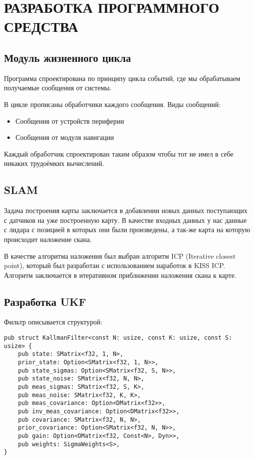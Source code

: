 \section{РАЗРАБОТКА ПРОГРАММНОГО СРЕДСТВА} %

\subsection{Модуль жизненного цикла}
Программа спроектирована по принципу цикла событий, где мы обрабатываем получаемые сообщения от системы.

В цикле прописаны обработчики каждого сообщения.
Виды сообщений:
\begin{itemize}
	\item Сообщения от устройств периферии
	\item Сообщения от модуля навигации
\end{itemize}

Каждый обработчик спроектирован таким образом чтобы тот не имел в себе никаких трудоёмких вычислений.

\subsection{SLAM}
Задача построения карты заключается в добавлении новых данных поступающих с датчиков на уже построенную карту.
В качестве входных данных у нас данные с лидара с позицией в которых они были произведены, а так-же карта на которую происходит наложение скана.

В качестве алгоритма наложения был выбран алгоритм ICP (Iterative closest point), который был разработан с использованием наработок в KISS ICP.
Алгоритм заключается в итеративном приближении наложения скана к карте.

%

\subsection{Разработка UKF}
Фильтр описывается структурой:
\begin{lstlisting}
pub struct KallmanFilter<const N: usize, const K: usize, const S: usize> {
    pub state: SMatrix<f32, 1, N>,
    prior_state: Option<SMatrix<f32, 1, N>>,
    pub state_sigmas: Option<SMatrix<f32, S, N>>,
    pub state_noise: SMatrix<f32, N, N>,
    pub meas_sigmas: SMatrix<f32, S, K>,
    pub meas_noise: SMatrix<f32, K, K>,
    pub meas_covariance: Option<DMatrix<f32>>,
    pub inv_meas_covariance: Option<DMatrix<f32>>,
    pub covariance: SMatrix<f32, N, N>,
    prior_covariance: Option<SMatrix<f32, N, N>>,
    pub gain: Option<OMatrix<f32, Const<N>, Dyn>>,
    pub weights: SigmaWeights<S>,
}
\end{lstlisting}



